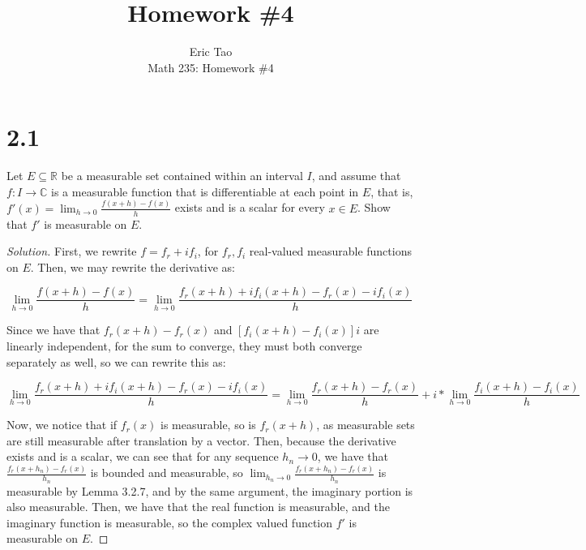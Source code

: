 \documentclass[10pt]{article}
\newenvironment{problem}[2][Problem]{\begin{trivlist}
\item[\hskip \labelsep {\bfseries #1}\hskip \labelsep {\bfseries #2.}]}{\end{trivlist}}
\begin{document}
 
\title{Homework \#4}
\author{Eric Tao\\
Math 235: Homework \#4}
\maketitle
 
\section*{2.1}

\begin{problem}{3.2.19}

Let $E \subseteq \mathbb{R}$ be a measurable set contained within an interval $I$, and assume that $f: I \to \mathbb{C}$ is a measurable function that is differentiable at each point in $E$, that is, $f'(x) = \lim_{h \to 0} \frac{f(x+h) - f(x)}{h}$ exists and is a scalar for every $x \in E$. Show that $f'$ is measurable on $E$. 

\end{problem}
\begin{proof}[Solution]
First, we rewrite $f = f_r + i f_i$, for $f_r, f_i$ real-valued measurable functions on $E$. Then, we may rewrite the derivative as:

$$\lim_{h \to 0} \frac{f(x+h) - f(x)}{h} = \lim_{h \to 0} \frac{f_r(x+h) + i f_i(x+h) - f_r(x) - i f_i(x)}{h}$$

Since we have that $f_r(x+h) - f_r(x)$ and $[f_i(x+h) - f_i(x)]i$ are linearly independent, for the sum to converge, they must both converge separately as well, so we can rewrite this as:

$$ \lim_{h \to 0} \frac{f_r(x+h) + i f_i(x+h) - f_r(x) - i f_i(x)}{h} = \lim_{h \to 0}\frac{f_r(x+h) - f_r(x)}{h} +  i * \lim_{h \to 0}\frac{f_i(x+h) - f_i(x)}{h}$$

Now, we notice that if $f_r(x)$ is measurable, so is $f_r(x+h)$, as measurable sets are still measurable after translation by a vector. Then, because the derivative exists and is a scalar, we can see that for any sequence $h_n \to 0$, we have that $\frac{f_r(x+h_n) - f_r(x)}{h_n}$ is bounded and measurable, so $ \lim_{h_n \to 0}\frac{f_r(x+h_n) - f_r(x)}{h_n}$ is measurable by Lemma 3.2.7, and by the same argument, the imaginary portion is also measurable. Then, we have that the real function is measurable, and the imaginary function is measurable, so the complex valued function $f'$ is measurable on $E$. 

\end{proof}
\end{document}
